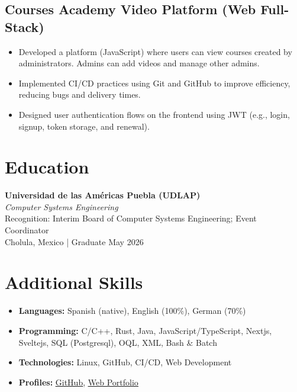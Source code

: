 \documentclass[a4paper,10pt]{article}
\begin{document}
\subsection*{Courses Academy Video Platform (Web Full-Stack)}
\begin{itemize}
    \item Developed a platform (JavaScript) where users can view courses created by administrators. Admins can add videos and manage other admins.
    \item Implemented CI/CD practices using Git and GitHub to improve efficiency, reducing bugs and delivery times.
    \item Designed user authentication flows on the frontend using JWT (e.g., login, signup, token storage, and renewal).
\end{itemize}


\section*{Education}
\textbf{Universidad de las Américas Puebla (UDLAP)}\\
\textit{Computer Systems Engineering}\\
Recognition: Interim Board of Computer Systems Engineering; Event Coordinator\\
Cholula, Mexico | Graduate May 2026

\section*{Additional Skills}
\begin{itemize}
    \item \textbf{Languages:} Spanish (native), English (100\%), German (70\%)
    \item \textbf{Programming:} C/C++, Rust, Java, JavaScript/TypeScript, Nextjs, Sveltejs, SQL (Postgresql), OQL, XML, Bash \& Batch
    \item \textbf{Technologies:} Linux, GitHub, CI/CD, Web Development
    \item \textbf{Profiles:} \underline{\href{https://github.com/HugeErick}{GitHub}}, \underline{\href{https://portafolio-delta-wheat.vercel.app/}{Web Portfolio}}
\end{itemize}
\end{document}
